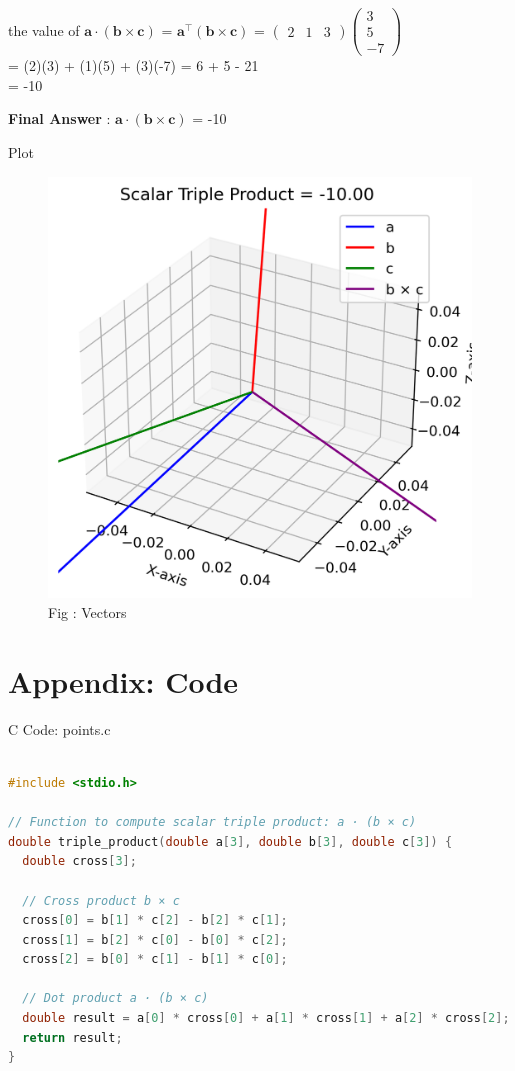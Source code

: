 \documentclass{beamer}
\numberwithin{equation}{section}
\theoremstyle{remark}
\newcommand{\myvec}[1]{\ensuremath{\begin{pmatrix}#1\end{pmatrix}}}
\let\vec\mathbf
\begin{document}
\begin{frame}
\begin{center}
the value of \(\vec{a}\cdot(\vec{b}\times\vec{c})\) = $\vec{a}^\top(\vec{b}\times\vec{c})$ = \myvec{2 & 1 & 3}\myvec{3\\5\\-7}\\
= (2)(3) + (1)(5) + (3)(-7) 
= 6 + 5 - 21\\
= -10

\textbf{Final Answer} : \(\vec{a}\cdot(\vec{b}\times\vec{c})\)  = -10 
\end{center}

\end{frame}

\begin{frame}{Plot}
\begin{figure}[h!]
  \centering
  \includegraphics[width=0.6\columnwidth]{figs/vectors.png} 
   \caption*{Fig : Vectors}
  \label{Fig1}
\end{figure}

\end{frame}

\section*{Appendix: Code}

\begin{frame}[fragile]{C Code: points.c}
\begin{lstlisting}[language=C]

#include <stdio.h>

// Function to compute scalar triple product: a · (b × c)
double triple_product(double a[3], double b[3], double c[3]) {
  double cross[3];

  // Cross product b × c
  cross[0] = b[1] * c[2] - b[2] * c[1];
  cross[1] = b[2] * c[0] - b[0] * c[2];
  cross[2] = b[0] * c[1] - b[1] * c[0];

  // Dot product a · (b × c)
  double result = a[0] * cross[0] + a[1] * cross[1] + a[2] * cross[2];
  return result;
}

\end{lstlisting}
\end{frame}
\end{document}

